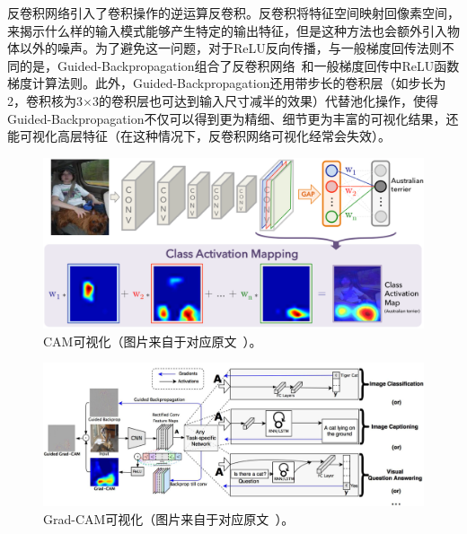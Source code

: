 反卷积网络引入了卷积操作的逆运算反卷积。反卷积将特征空间映射回像素空间，来揭示什么样的输入模式能够产生特定的输出特征，但是这种方法也会额外引入物体以外的噪声。为了避免这一问题，对于ReLU反向传播，与一般梯度回传法则不同的是，Guided-Backpropagation组合了反卷积网络~\cite{zeiler2010deconvolutional}和一般梯度回传中ReLU函数梯度计算法则。此外，Guided-Backpropagation还用带步长的卷积层（如步长为2，卷积核为3$\times$3的卷积层也可达到输入尺寸减半的效果）代替池化操作，使得Guided-Backpropagation不仅可以得到更为精细、细节更为丰富的可视化结果，还能可视化高层特征（在这种情况下，反卷积网络可视化经常会失效）。
\begin{figure}[h]
	\centering
	\includegraphics[width=1.0\textwidth]{figure/cam_arichitecture}
	\caption[CAM可视化]{CAM可视化（图片来自于对应原文~\cite{zhou2016learning}）。}
	\label{fig:cam_arichitecture}
\end{figure}
\begin{figure}[h]
	\centering
	\includegraphics[width=1.0\textwidth]{figure/grad_cam_architecture}
	\caption[Grad-CAM可视化]{Grad-CAM可视化（图片来自于对应原文~\cite{selvaraju2017grad}）。}
	\label{fig:grad_cam_architecture}
\end{figure}
